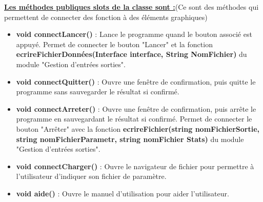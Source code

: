 \documentclass[a4paper,11pt]{article}
\begin{document}
			\underline{\bf Les méthodes publiques slots de la classe sont :}(Ce sont des méthodes qui permettent de connecter des fonction à des éléments graphiques)\\

			\begin{itemize}
				\item \textbf{void connectLancer()} : Lance le programme quand le bouton associé est appuyé. Permet de connecter le bouton "Lancer" et la fonction \textbf{ecrireFichierDonnées(Interface interface, String NomFichier)} du module "Gestion d'entrées sorties".\vspace{0.2cm}
				\item \textbf{void connectQuitter()} : Ouvre une fenêtre de confirmation, puis quitte le programme sans sauvegarder le résultat si confirmé.\vspace{0.2cm}
				\item \textbf{void connectArreter()} : Ouvre une fenêtre de confirmation, puis arrête le programme en sauvegardant le résultat si confirmé. Permet de connecter le bouton "Arrêter" avec la fonction \textbf{ecrireFichier(string nomFichierSortie, string nomFichierParametr, string nomFichier Stats)} du module "Gestion d'entrées sorties".\vspace{0.2cm} 
				\item \textbf{void connectCharger()} : Ouvre le navigateur de fichier pour permettre à l’utilisateur d’indiquer son fichier de paramètre.\vspace{0.2cm}
				\item \textbf{void aide()} : Ouvre le manuel d’utilisation pour aider l’utilisateur.\\
			\end{itemize}
			
\end{document}
